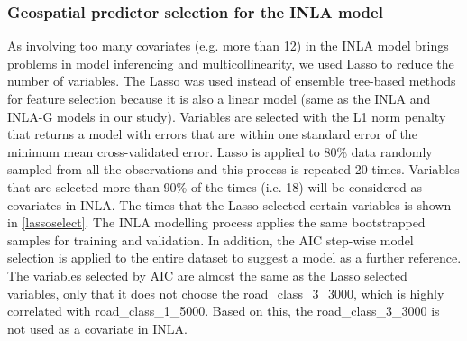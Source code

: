 \documentclass{article}
\begin{document}
\subsubsection{Geospatial predictor selection for the INLA model} 

As involving too many covariates (e.g. more than 12) in the INLA model brings problems in model inferencing and multicollinearity, we used Lasso to reduce the number of variables. The Lasso was used instead of ensemble tree-based methods for feature selection because it is also a linear model (same as the INLA and INLA-G models in our study). Variables are selected with the L1 norm penalty that returns a model with errors that are within one standard error of the minimum mean cross-validated error. Lasso is applied to 80\% data randomly sampled from all the observations and this process is repeated  20 times. Variables that are selected more than 90\% of the times (i.e. 18) will be considered as covariates in INLA. The times that the Lasso selected certain variables is shown in \cref{lassoselect}. The INLA modelling process applies the same bootstrapped samples for training and validation.  In addition, the AIC step-wise model selection is applied to the entire dataset to suggest a model as a further reference. The variables selected by AIC are almost the same as the Lasso selected variables, only that it does not choose the road\_class\_3\_3000, which is highly correlated with  road\_class\_1\_5000. Based on this, the road\_class\_3\_3000 is not used as a covariate in INLA.  
\end{document}
